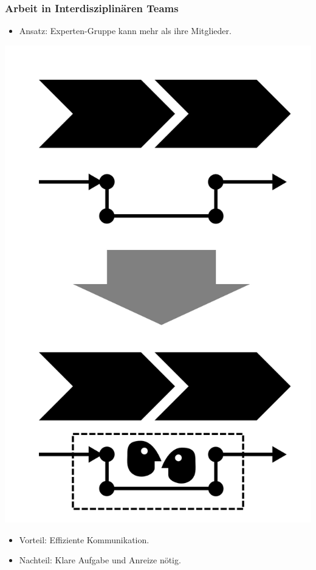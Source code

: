 \documentclass[xcolor=dvipsnames]{beamer}
\begin{document}
 \begin{frame}
  \frametitle{Arbeit in Interdisziplinären Teams}
  \begin{itemize}
    \item Ansatz: Experten-Gruppe kann mehr als ihre Mitglieder.
  \end{itemize}
  \centerline{\includegraphics[scale=2.5]{4_6_9.png}}
  \begin{itemize}
    \item Vorteil: Effiziente Kommunikation.
    \item Nachteil: Klare Aufgabe und Anreize nötig.
  \end{itemize}
 \end{frame}
\end{document}
